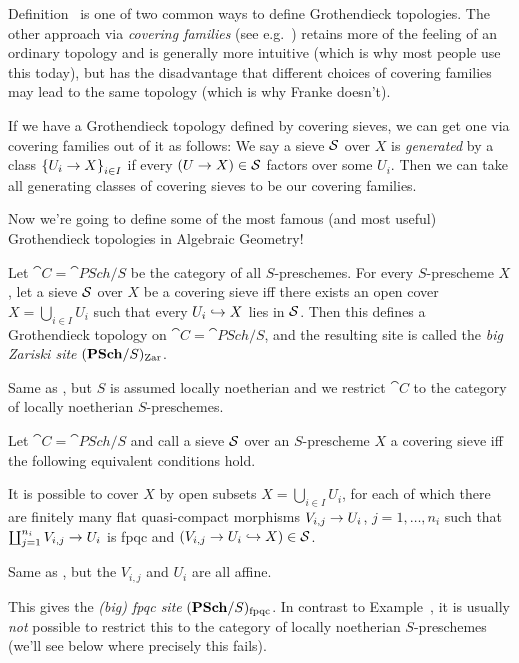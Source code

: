 \documentclass[a4paper,parskip=half,numbers=enddot, DIV=12]{scrreprt}
\begin{document}
\begin{rem}
	Definition~ is one of two common ways to define Grothendieck topologies. The other approach via \emph{covering families} (see e.g.\ \cite[]{stacks-project}) retains more of the feeling of an ordinary topology and is generally more intuitive (which is why most people use this today), but has the disadvantage that different choices of covering families may lead to the same topology (which is why Franke doesn't).
	
	If we have a Grothendieck topology defined by covering sieves, we can get one via covering families out of it as follows: We say a sieve $\mathcal{S}$ over $X$ is \emph{generated} by a class $\left\{U_i\morphism X\right\}_{i\in I}$ if every $(U\morphism X)\in \Ss$ factors over some $U_i$. Then we can take all generating classes of covering sieves to be our covering families.
\end{rem}
Now we're going to define some of the most famous (and most useful) Grothendieck topologies in Algebraic Geometry!
\begin{example}
	\begin{alphanumerate}
		\item {}Let $\cat C=\cat{PSch}/S$ be the category of all $S$-preschemes. For every $S$-prescheme $X$, let a sieve $\mathcal{S}$ over $X$ be a covering sieve iff there exists an open cover $X=\bigcup_{i\in I}U_i$ such that every $U_i\monomorphism X$ lies in $\mathcal{S}$. Then this defines a Grothendieck topology on $\cat C=\cat{PSch}/S$, and the resulting site is called the \emph{big Zariski site} $(\cat{PSch}/S)_\Zar$.
		\item Same as , but $S$ is assumed locally noetherian and we restrict $\cat C$ to the category of locally noetherian $S$-preschemes.
	\end{alphanumerate}
\end{example}
\begin{example}
	Let $\cat C=\cat{PSch}/S$ and call a sieve $\mathcal{S}$ over an $S$-prescheme $X$ a covering sieve iff the following equivalent conditions hold.
	\begin{alphanumerate}
		\item It is possible to cover $X$ by open subsets $X=\bigcup_{i\in I}U_i$, for each of which there are finitely many flat quasi-compact morphisms $V_{i,j}\morphism U_i$, $j=1,\ldots,n_i$ such that $\coprod_{j=1}^{n_i}V_{i,j}\morphism U_i$ is fpqc and $(V_{i,j}\morphism U_i\monomorphism X)\in\Ss$.
		\item Same as , but the $V_{i,j}$ and $U_i$ are all affine.
	\end{alphanumerate}
	This gives the \emph{(big) fpqc site} $(\cat{PSch}/S)_\fpqc$. In contrast to Example~, it is usually \emph{not} possible to restrict this to the category of locally noetherian $S$-preschemes (we'll see below where precisely this fails).
\end{example}
\end{document}

